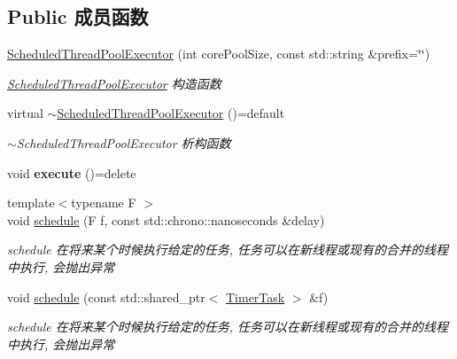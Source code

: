 \subsection*{Public 成员函数}
\begin{DoxyCompactItemize}
\item 
\hyperlink{classScheduledThreadPoolExecutor_a880b17439bcdcf9b7542925e24033691}{Scheduled\+Thread\+Pool\+Executor} (int core\+Pool\+Size, const std\+::string \&prefix=\char`\"{}\char`\"{})
\begin{DoxyCompactList}\small\item\em \hyperlink{classScheduledThreadPoolExecutor}{Scheduled\+Thread\+Pool\+Executor} 构造函数 \end{DoxyCompactList}\item 
\mbox{\label{classScheduledThreadPoolExecutor_aa8d3f9083aa92b351be6e134d7a675ea}} 
virtual \hyperlink{classScheduledThreadPoolExecutor_aa8d3f9083aa92b351be6e134d7a675ea}{$\sim$\+Scheduled\+Thread\+Pool\+Executor} ()=default
\begin{DoxyCompactList}\small\item\em $\sim$\+Scheduled\+Thread\+Pool\+Executor 析构函数 \end{DoxyCompactList}\item 
\mbox{\label{classScheduledThreadPoolExecutor_aabb4dbe81086385fb97cfa2a5d838dc8}} 
void {\bfseries execute} ()=delete
\item 
{\footnotesize template$<$typename F $>$ }\\void \hyperlink{classScheduledThreadPoolExecutor_a45e622833714db87a86d50eb45c8f338}{schedule} (F f, const std\+::chrono\+::nanoseconds \&delay)
\begin{DoxyCompactList}\small\item\em schedule 在将来某个时候执行给定的任务, 任务可以在新线程或现有的合并的线程中执行, 会抛出异常 \end{DoxyCompactList}\item 
void \hyperlink{classScheduledThreadPoolExecutor_a30f723414e619a950f1efd968d13921d}{schedule} (const std\+::shared\+\_\+ptr$<$ \hyperlink{structTimerTask}{Timer\+Task} $>$ \&f)
\begin{DoxyCompactList}\small\item\em schedule 在将来某个时候执行给定的任务, 任务可以在新线程或现有的合并的线程中执行, 会抛出异常 \end{DoxyCompactList}\item 

\end{DoxyCompactItemize}
